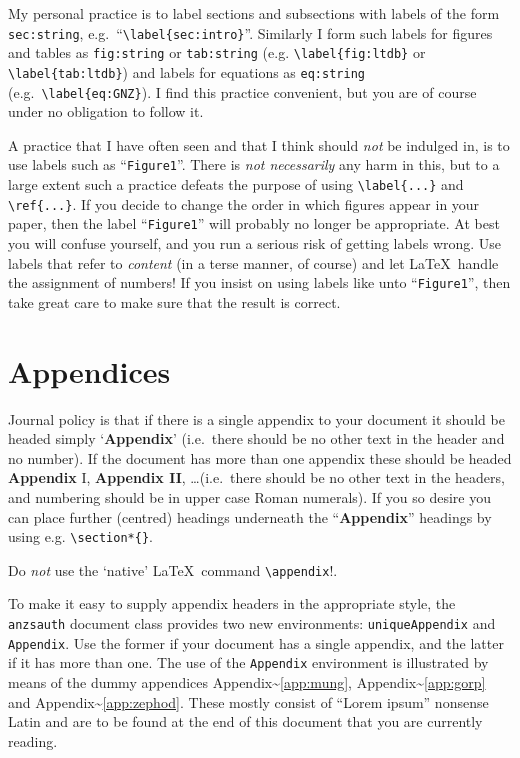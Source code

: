 \documentclass[
  times,
  doublespace]{anzsauth}
\begin{document}
My personal practice is to label sections and subsections with labels of
the form \texttt{sec:string},
e.g.~``\texttt{\textbackslash{}label\{sec:intro\}}''. Similarly I form
such labels for figures and tables as \texttt{fig:string} or
\texttt{tab:string} (e.g. \texttt{\textbackslash{}label\{fig:ltdb\}} or
\texttt{\textbackslash{}label\{tab:ltdb\}}) and labels for equations as
\texttt{eq:string} (e.g.~\texttt{\textbackslash{}label\{eq:GNZ\}}). I
find this practice convenient, but you are of course under no obligation
to follow it.

A practice that I have often seen and that I think should \emph{not} be
indulged in, is to use labels such as ``\texttt{Figure1}''. There is
\emph{not necessarily} any harm in this, but to a large extent such a
practice defeats the purpose of using
\texttt{\textbackslash{}label\{...\}} and
\texttt{\textbackslash{}ref\{...\}}. If you decide to change the order
in which figures appear in your paper, then the label
``\texttt{Figure1}'' will probably no longer be appropriate. At best you
will confuse yourself, and you run a serious risk of getting labels
wrong. Use labels that refer to \emph{content} (in a terse manner, of
course) and let \LaTeX~handle the assignment of numbers! If you insist
on using labels like unto ``\texttt{Figure1}'', then take great care to
make sure that the result is correct.

\section{Appendices}\label{sec:append}

Journal policy is that if there is a single appendix to your document it
should be headed simply `\textbf{Appendix}' (i.e.~there should be no
other text in the header and no number). If the document has more than
one appendix these should be headed \textbf{Appendix} I,
\textbf{Appendix II}, \ldots (i.e.~there should be no other text in the
headers, and numbering should be in upper case Roman numerals). If you
so desire you can place further (centred) headings underneath the
``\textbf{Appendix}'' headings by using e.g.
\texttt{\textbackslash{}section*\{\}}.

Do \emph{not} use the `native' \LaTeX~command
\texttt{\textbackslash{}appendix}!.

To make it easy to supply appendix headers in the appropriate style, the
\texttt{anzsauth} document class provides two new environments:
\texttt{uniqueAppendix} and \texttt{Appendix}. Use the former if your
document has a single appendix, and the latter if it has more than one.
The use of the \texttt{Appendix} environment is illustrated by means of
the dummy appendices Appendix\textasciitilde{}\ref{app:mung},
Appendix\textasciitilde{}\ref{app:gorp} and
Appendix\textasciitilde{}\ref{app:zephod}. These mostly consist of
``Lorem ipsum'' nonsense Latin and are to be found at the end of this
document that you are currently reading.
\end{document}

